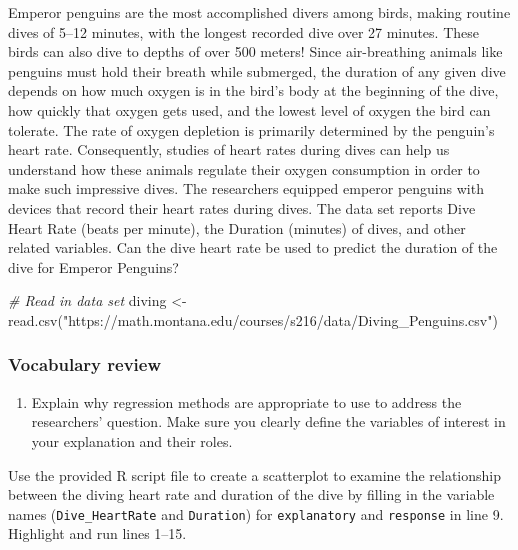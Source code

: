 \documentclass[
]{report}
\newenvironment{Shaded}{\begin{snugshade}}{\end{snugshade}}
\newcommand{\CommentTok}[1]{\textcolor[rgb]{0.56,0.35,0.01}{\textit{#1}}}
\newcommand{\FunctionTok}[1]{\textcolor[rgb]{0.00,0.00,0.00}{#1}}
\newcommand{\NormalTok}[1]{#1}
\newcommand{\OtherTok}[1]{\textcolor[rgb]{0.56,0.35,0.01}{#1}}
\newcommand{\StringTok}[1]{\textcolor[rgb]{0.31,0.60,0.02}{#1}}
\providecommand{\tightlist}{%
  \setlength{\itemsep}{0pt}\setlength{\parskip}{0pt}}
\begin{document}
Emperor penguins are the most accomplished divers among birds, making routine dives of 5--12 minutes, with the longest recorded dive over 27 minutes. These birds can also dive to depths of over 500 meters! Since air-breathing animals like penguins must hold their breath while submerged, the duration of any given dive depends on how much oxygen is in the bird's body at the beginning of the dive, how quickly that oxygen gets used, and the lowest level of oxygen the bird can tolerate. The rate of oxygen depletion is primarily determined by the penguin's heart rate. Consequently, studies of heart rates during dives can help us understand how these animals regulate their oxygen consumption in order to make such impressive dives. The researchers equipped emperor penguins with devices that record their heart rates during dives. The data set reports Dive Heart Rate (beats per minute), the Duration (minutes) of dives, and other related variables. Can the dive heart rate be used to predict the duration of the dive for Emperor Penguins?

\begin{Shaded}
\begin{Highlighting}[]
\CommentTok{\# Read in data set}
\NormalTok{diving }\OtherTok{\textless{}{-}} \FunctionTok{read.csv}\NormalTok{(}\StringTok{"https://math.montana.edu/courses/s216/data/Diving\_Penguins.csv"}\NormalTok{)}
\end{Highlighting}
\end{Shaded}

\hypertarget{vocabulary-review-3}{%
\subsubsection*{Vocabulary review}\label{vocabulary-review-3}}

\begin{enumerate}
\def\labelenumi{\arabic{enumi}.}
\tightlist
\item
  Explain why regression methods are appropriate to use to address the researchers' question. Make sure you clearly define the variables of interest in your explanation and their roles.
\end{enumerate}

\vspace{.5in}

Use the provided R script file to create a scatterplot to examine the relationship between the diving heart rate and duration of the dive by filling in the variable names (\texttt{Dive\_HeartRate} and \texttt{Duration}) for \texttt{explanatory} and \texttt{response} in line 9. Highlight and run lines 1--15.
\end{document}
